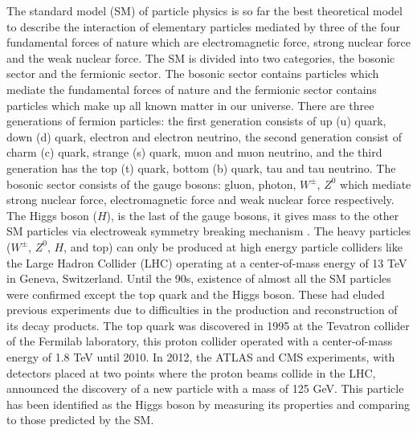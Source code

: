 \documentclass[final,12p]{article}
\begin{document}
The standard model (SM) of particle physics is so far the best theoretical model to describe the interaction of elementary particles mediated by three of the four fundamental forces of nature which are electromagnetic force, strong nuclear force and the weak nuclear force. The SM is divided into two categories, the bosonic sector and the fermionic sector.
The bosonic sector contains particles which mediate the fundamental forces of nature and the fermionic sector contains particles which make up all known matter in our universe.
There are three generations of fermion particles: the first generation consists of up (u) quark, down (d) quark, electron and electron neutrino, the second generation consist of charm (c) quark, strange (s) quark, muon and muon neutrino, and the third generation has the top (t) quark, bottom (b) quark, tau and tau neutrino.
The bosonic sector consists of the gauge bosons: gluon, photon, $W^{\pm}$, $Z^0$ which mediate strong nuclear force, electromagnetic force and weak nuclear force respectively.
The Higgs boson ($H$), is the last of the gauge bosons, it gives mass to the other SM particles via electroweak symmetry breaking mechanism \cite{Chatrchyan:2012xdj}.
The heavy particles ($W^{\pm}$, $Z^0$, $H$, and top) can only be produced at high energy particle colliders like the Large Hadron Collider (LHC) operating at a center-of-mass energy of 13 TeV in Geneva, Switzerland.
Until the 90s, existence of almost all the SM particles were confirmed except the top quark and the Higgs boson. 
These had eluded previous experiments due to difficulties in the production and reconstruction of its decay products.
The top quark was discovered in 1995 at the Tevatron collider of the Fermilab laboratory, this proton collider operated with a center-of-mass energy of 1.8 TeV until 2010.
In 2012, the ATLAS and CMS experiments, with detectors placed at two points where the proton beams collide in the LHC, announced the discovery of a new particle with a mass of 125 GeV.
This particle has been identified as the Higgs boson by measuring its properties and comparing to those predicted by the SM.
\end{document}
